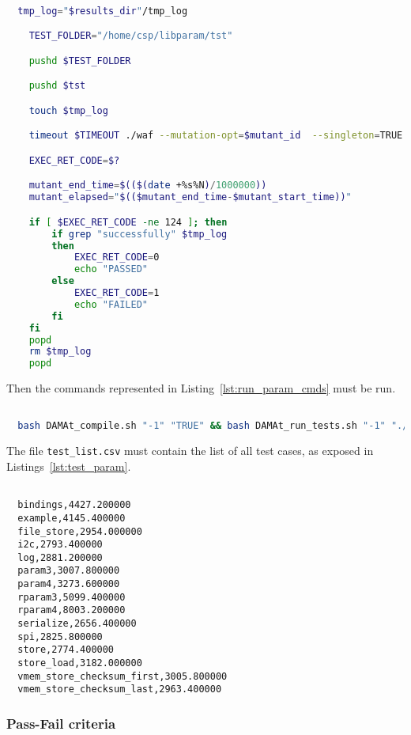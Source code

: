   \begin{lstlisting}[language=bash, label={lst:run_param}]

  tmp_log="$results_dir"/tmp_log

    TEST_FOLDER="/home/csp/libparam/tst"

    pushd $TEST_FOLDER

    pushd $tst

    touch $tmp_log

    timeout $TIMEOUT ./waf --mutation-opt=$mutant_id  --singleton=TRUE 2>&1 | tee $tmp_log

    EXEC_RET_CODE=$?

    mutant_end_time=$(($(date +%s%N)/1000000))
    mutant_elapsed="$(($mutant_end_time-$mutant_start_time))"

    if [ $EXEC_RET_CODE -ne 124 ]; then
        if grep "successfully" $tmp_log
        then
            EXEC_RET_CODE=0
            echo "PASSED"
        else
            EXEC_RET_CODE=1
            echo "FAILED"
        fi
    fi
    popd
    rm $tmp_log
    popd

  \end{lstlisting}

Then the commands represented in Listing~\ref{lst:run_param_cmds} must be run.


  \begin{lstlisting}[language=bash, label={lst:run_param_cmds}]

  bash DAMAt_compile.sh "-1" "TRUE" && bash DAMAt_run_tests.sh "-1" "./test_list.csv" "./"

  \end{lstlisting}

The file \texttt{test\_list.csv} must contain the list of all test cases, as exposed in Listings~\ref{lst:test_param}.

  \begin{lstlisting}[label={lst:test_param}]

  bindings,4427.200000
  example,4145.400000
  file_store,2954.000000
  i2c,2793.400000
  log,2881.200000
  param3,3007.800000
  param4,3273.600000
  rparam3,5099.400000
  rparam4,8003.200000
  serialize,2656.400000
  spi,2825.800000
  store,2774.400000
  store_load,3182.000000
  vmem_store_checksum_first,3005.800000
  vmem_store_checksum_last,2963.400000

  \end{lstlisting}

  \subsubsection{Pass-Fail criteria}

